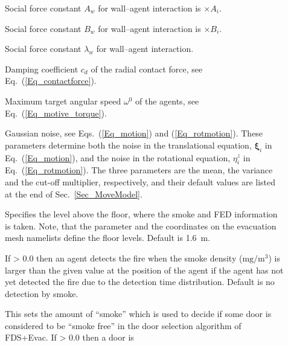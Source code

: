 \documentclass[12pt,a4paper,final,twoside]{stylevk}
\begin{document}
\begin{description}
%
\item[] Social force constant $A_w$ for
  wall--agent interaction is $\times A_i$.
%
\item[] Social force constant $B_w$ for
  wall--agent interaction is $\times B_i$.
%
\item[] Social force constant $\lambda_w$ for
  wall--agent interaction.
%
\item[] Damping coefficient $c_d$ of the radial
  contact force, see Eq.~(\ref{Eq_contactforce}).
%
\item[] Maximum target angular speed $\omega^0$ of
  the agents, see Eq.~(\ref{Eq_motive_torque}).
%
\item[] Gaussian noise, see
  Eqs.~(\ref{Eq_motion}) and (\ref{Eq_rotmotion}).  These parameters
  determine both the noise in the translational equation,
  ${\boldsymbol \xi}_i$ in Eq.~(\ref{Eq_motion}), and the noise in the
  rotational equation, ${\eta}^z_{i}$ in Eq.~(\ref{Eq_rotmotion}). The
  three parameters are the mean, the variance and the cut-off
  multiplier, respectively, and their default values are listed at the
  end of Sec.~\ref{Sec_MoveModel}.
%
%
\item[] Specifies the level above the
  floor, where the smoke and FED information is taken.  Note, that the
  parameter  and the coordinates  on
  the evacuation mesh namelists define the floor levels.  Default is
  1.6~m.
%
\item[] If > 0.0 then an agent detects the
  fire when the smoke density ($\mathrm{mg/m^3}$) is larger than the
  given value at the position of the agent if the agent has not yet
  detected the fire due to the detection time distribution.  Default
  is no detection by smoke.
%
\item[] This sets the amount of ``smoke'' which
  is used to decide if some door is considered to be ``smoke free'' in
  the door selection algorithm of FDS+Evac.  If > 0.0 then a door is

\end{description}
\end{document}
